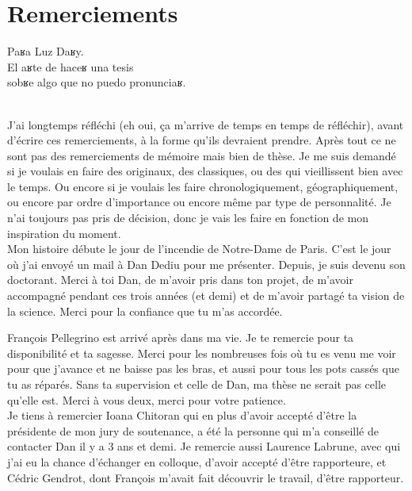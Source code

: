 \section*{Remerciements}

\begin{flushright}
Paʁa Luz Daʁy.\\
El aʁte de haceʁ una tesis \\sobʁe algo que no puedo pronunciaʁ.
\end{flushright}
~\\


J'ai longtemps réfléchi (eh oui, ça m'arrive de temps en temps de réfléchir), avant d'écrire ces remerciements, à la forme qu'ils devraient prendre. Après tout ce ne sont pas des remerciements de mémoire mais bien de thèse.
Je me suis demandé si je voulais en faire des originaux, des classiques, ou des qui vieillissent bien avec le temps. Ou encore si je voulais les faire chronologiquement, géographiquement, ou encore par ordre d'importance ou encore même par type de personnalité. Je n'ai toujours pas pris de décision, donc je vais les faire en fonction de mon inspiration du moment.\\

Mon histoire débute le jour de l'incendie de Notre-Dame de Paris. C'est le jour où j'ai envoyé un mail à Dan Dediu pour me présenter. Depuis, je suis devenu son doctorant. Merci à toi Dan, de m'avoir pris dans ton projet, de m'avoir accompagné pendant ces trois années (et demi) et de m'avoir partagé ta vision de la science. Merci pour la confiance que tu m'as accordée.

François Pellegrino est arrivé après dans ma vie. Je te remercie pour ta disponibilité et ta sagesse. Merci pour les nombreuses fois où tu es venu me voir pour que j'avance et ne baisse pas les bras, et aussi pour tous les pots cassés que tu as réparés. Sans ta supervision et celle de Dan, ma thèse ne serait pas celle qu'elle est. Merci à vous deux, merci pour votre patience.\\

Je tiens à remercier Ioana Chitoran qui en plus d'avoir accepté d'être la présidente de mon jury de soutenance, a été la personne qui m'a conseillé de contacter Dan il y a 3 ans et demi. Je remercie aussi Laurence Labrune, avec qui j'ai eu la chance d'échanger en colloque, d'avoir accepté d'être rapporteure, et Cédric Gendrot, dont François m'avait fait découvrir le travail, d'être rapporteur.\\

